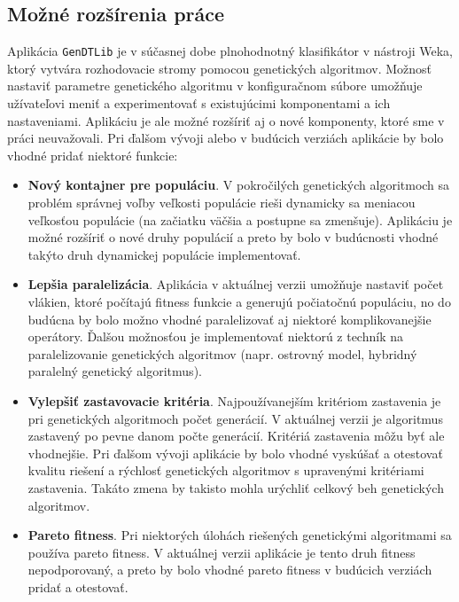 \subsection{Možné rozšírenia práce}
Aplikácia \verb|GenDTLib| je v súčasnej dobe plnohodnotný klasifikátor v nástroji Weka, ktorý vytvára rozhodovacie stromy pomocou genetických algoritmov. Možnosť nastaviť parametre genetického algoritmu v konfiguračnom súbore umožňuje užívateľovi meniť a experimentovať s existujúcimi komponentami a ich nastaveniami. Aplikáciu je ale možné rozšíriť aj o nové komponenty, ktoré sme v práci neuvažovali. Pri ďalšom vývoji alebo v budúcich verziách aplikácie by bolo vhodné pridať niektoré funkcie:

\begin{itemize}
\item \textbf{Nový kontajner pre populáciu}. V pokročilých genetických algoritmoch sa problém správnej voľby veľkosti populácie rieši dynamicky sa meniacou veľkosťou populácie (na začiatku väčšia a postupne sa zmenšuje). Aplikáciu je možné rozšíriť o nové druhy populácií a preto by bolo v budúcnosti vhodné takýto druh dynamickej populácie implementovať.
\item \textbf{Lepšia paralelizácia}. Aplikácia v aktuálnej verzii umožňuje nastaviť počet vlákien, ktoré počítajú fitness funkcie a generujú počiatočnú populáciu, no do budúcna by bolo možno vhodné paralelizovať aj niektoré komplikovanejšie operátory. Ďalšou možnosťou je implementovať niektorú z techník na paralelizovanie genetických algoritmov (napr. ostrovný model, hybridný paralelný genetický algoritmus).
\item \textbf{Vylepšiť zastavovacie kritéria}. Najpoužívanejším kritériom zastavenia je pri genetických algoritmoch počet generácií. V aktuálnej verzii je algoritmus zastavený po pevne danom počte generácií. Kritériá zastavenia môžu byť ale vhodnejšie. Pri ďalšom vývoji aplikácie by bolo vhodné vyskúšať a otestovať kvalitu riešení a rýchlosť genetických algoritmov s upravenými kritériami zastavenia. Takáto zmena by takisto mohla urýchliť celkový beh genetických algoritmov.
\item \textbf{Pareto fitness}. Pri niektorých úlohách riešených genetickými algoritmami sa používa pareto fitness. V aktuálnej verzii aplikácie je tento druh fitness nepodporovaný, a preto by bolo vhodné pareto fitness v budúcich verziách pridať a otestovať.
\end{itemize}